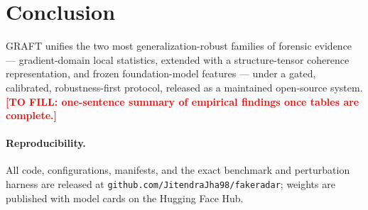 \documentclass[10pt,twocolumn]{article}
\newcommand{\tofill}[1]{\textcolor{red}{\textbf{[TO FILL: #1]}}}
\begin{document}
\section{Conclusion}
GRAFT unifies the two most generalization-robust families of forensic
evidence --- gradient-domain local statistics, extended with a
structure-tensor coherence representation, and frozen foundation-model
features --- under a gated, calibrated, robustness-first protocol, released
as a maintained open-source system. \tofill{one-sentence summary of empirical
findings once tables are complete.}

\paragraph{Reproducibility.} All code, configurations, manifests, and the
exact benchmark and perturbation harness are released at
\texttt{github.com/JitendraJha98/fakeradar}; weights are published with model
cards on the Hugging Face Hub.



\end{document}
